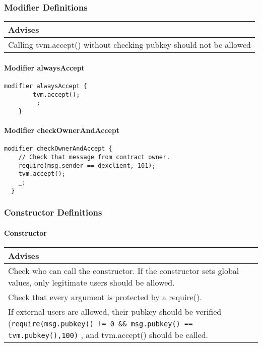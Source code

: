\subsubsection{Modifier Definitions}


\ifsoldraft
\noindent\begin{tabular}{|p{12cm}|}\hline
\rowcolor{green}Advises
\\\hline
Calling tvm.accept() without checking pubkey should not be allowed
\\\hline\end{tabular}
\fi

\paragraph{Modifier alwaysAccept}


\begin{lstlisting}[firstnumber=27]
	modifier alwaysAccept {
		tvm.accept();
		_;
	}
\end{lstlisting}

\paragraph{Modifier checkOwnerAndAccept}


\begin{lstlisting}[firstnumber=32]
  modifier checkOwnerAndAccept {
    // Check that message from contract owner.
    require(msg.sender == dexclient, 101);
    tvm.accept();
    _;
  }
\end{lstlisting}

\subsubsection{Constructor Definitions}


\paragraph{Constructor}


\ifsoldraft
\noindent\begin{tabular}{|p{12cm}|}\hline
\rowcolor{green}Advises
\\\hline
Check who can call the constructor. If the constructor sets global values, only legitimate users should be allowed.
\\\hline
Check that every argument is protected by a require().
\\\hline
If external users are allowed, their pubkey should be verified (\verb+require(msg.pubkey() != 0 && msg.pubkey() == tvm.pubkey(),100)+ , and tvm.accept() should be called.
\\\hline\end{tabular}
\fi

